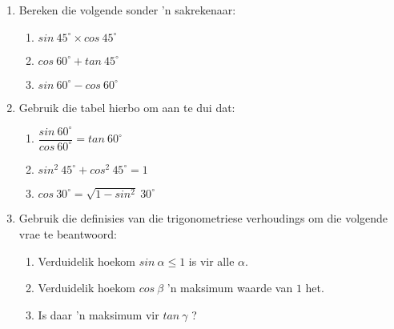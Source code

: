 \begin{exercises}{}{
\begin{enumerate}[itemsep=6pt, label=\textbf{\arabic*}. ] 
\item Bereken die volgende sonder 'n sakrekenaar:
\begin{enumerate}[noitemsep, label=\textbf{(\alph*)} ]
\item $sin~45^{\circ} \times cos~45^{\circ}$
\item $cos~60^{\circ} + tan~45^{\circ}$
\item $sin~60^{\circ} - cos~60^{\circ}$
\end{enumerate}

\item Gebruik die tabel hierbo om aan te dui dat:
\begin{enumerate}[itemsep=5pt, label=\textbf{(\alph*)} ]
\item $\dfrac{sin~60^{\circ}}{cos~60^{\circ}} = tan~60^{\circ} $
\item $sin^{2}~45^{\circ}+ cos^{2}~45^{\circ} =1 $
\item $cos~30^{\circ} =\sqrt{1- sin^{2}}~30^{\circ}$
\end{enumerate}

\item Gebruik die definisies van die trigonometriese verhoudings om die volgende vrae te beantwoord:
\begin{enumerate}[noitemsep, label=\textbf{(\alph*)} ]
\item Verduidelik hoekom $sin~\alpha \leq 1$ is vir alle $\alpha$.
\item Verduidelik hoekom $cos~\beta$ 'n maksimum waarde van $1$ het.
\item Is daar 'n maksimum vir $tan~\gamma$ ?
\end{enumerate}
\end{enumerate}
}
\end{exercises}


